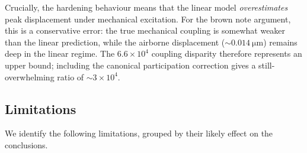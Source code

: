 Crucially, the hardening behaviour means that the linear model
\emph{overestimates} peak displacement under mechanical excitation.  For the
brown note argument, this is a conservative error: the true mechanical coupling
is somewhat weaker than the linear prediction, while the airborne displacement
($\sim\SI{0.014}{\micro\metre}$) remains deep in the linear regime.  The
$6.6 \times 10^4$ coupling disparity therefore represents an upper bound;
including the canonical participation correction gives a still-overwhelming
ratio of $\sim 3 \times 10^4$.

\subsection{Limitations}
\label{sec:disc:limitations}

We identify the following limitations, grouped by their likely effect on
the conclusions.

